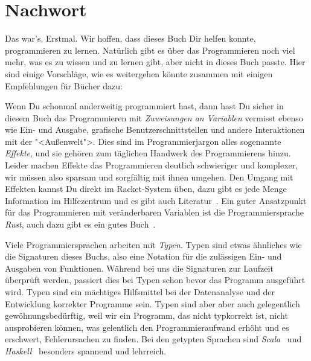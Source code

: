 
\chapter*{Nachwort}
\label{chap:nachwort}

Das war's.  Erstmal.  Wir hoffen, dass dieses Buch Dir helfen konnte,
programmieren zu lernen.  Natürlich gibt es über das Programmieren
noch viel mehr, was es zu wissen und zu lernen gibt, aber nicht in
dieses Buch passte.  Hier sind einige Vorschläge, wie es weitergehen
könnte zusammen mit einigen Empfehlungen für Bücher dazu:

Wenn Du schonmal anderweitig programmiert hast, dann hast Du
  sicher in diesem Buch das Programmieren mit \emph{Zuweisungen an Variablen}
  vermisst ebenso wie Ein- und Ausgabe, grafische
  Benutzerschnittstellen und andere Interaktionen mit der
  "<Außenwelt">.  Dies sind im Programmierjargon alles sogenannte
  \textit{Effekte}, und sie gehören zum täglichen
  Handwerk des Programmierens hinzu.  Leider machen Effekte das
  Programmieren deutlich schwieriger und komplexer, wir müssen also
  sparsam und sorgfältig mit ihnen umgehen. Den Umgang mit Effekten
  kannst Du direkt im Racket-System üben, dazu gibt es jede Menge
  Information im Hilfezentrum und es gibt auch
  Literatur~\cite{FelleisenEtAll2013}.  Ein guter Ansatzpunkt für das
  Programmieren mit veränderbaren Variablen ist die Programmiersprache
  \textit{Rust}, auch dazu gibt es ein gutes
  Buch~\cite{KlabnikNichols2018}.

Viele Programmiersprachen arbeiten mit
  \textit{Typen}.  Typen sind etwas ähnliches wie die
  Signaturen dieses Buchs, also eine Notation für die zulässigen Ein-
  und Ausgaben von Funktionen.  Während bei uns die Signaturen zur
  Laufzeit überprüft werden, passiert dies bei Typen schon bevor das
  Programm ausgeführt wird.  Typen sind ein mächtiges Hilfsmittel bei
  der Datenanalyse und der Entwicklung korrekter Programme sein.
  Typen sind aber aber auch gelegentlich gewöhnungsbedürftig, weil wir
  ein Programm, das nicht typkorrekt ist, nicht ausprobieren können,
  was gelentlich den Programmieraufwand erhöht und es erschwert,
  Fehlerursachen zu finden.  Bei den getypten Sprachen sind
  \textit{Scala}~\cite{ChiusanoBjarnason2014} und
  \textit{Haskell}~\cite{Hutton2016} besonders spannend und
  lehrreich.

